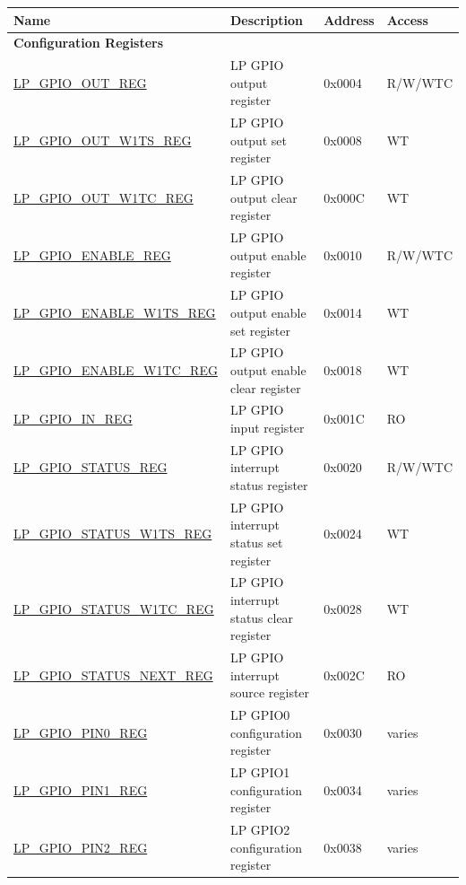 \begin{longtable}{ | p{5.7cm} | p{7cm} | p{1.3cm} | p{1.9cm} | }
\hline\rowcolor{lightgray}
\textbf{Name} & \textbf{Description} &  \textbf{Address} & \textbf{Access} \\ \hline
\endhead
\multicolumn{4}{|l|}{\textbf{Configuration Registers}} \\ \hline
\hyperref[regdesc:LPGPIOOUTREG]{LP\_GPIO\_OUT\_REG} & LP GPIO output register & 0x0004 & R/W/WTC \\ \hline
\hyperref[regdesc:LPGPIOOUTW1TSREG]{LP\_GPIO\_OUT\_W1TS\_REG} & LP GPIO output set register & 0x0008 & WT \\ \hline
\hyperref[regdesc:LPGPIOOUTW1TCREG]{LP\_GPIO\_OUT\_W1TC\_REG} & LP GPIO output clear register & 0x000C & WT \\ \hline
\hyperref[regdesc:LPGPIOENABLEREG]{LP\_GPIO\_ENABLE\_REG} & LP GPIO output enable register & 0x0010 & R/W/WTC \\ \hline
\hyperref[regdesc:LPGPIOENABLEW1TSREG]{LP\_GPIO\_ENABLE\_W1TS\_REG} & LP GPIO output enable set register & 0x0014 & WT \\ \hline
\hyperref[regdesc:LPGPIOENABLEW1TCREG]{LP\_GPIO\_ENABLE\_W1TC\_REG} & LP GPIO output enable clear register & 0x0018 & WT \\ \hline
\hyperref[regdesc:LPGPIOINREG]{LP\_GPIO\_IN\_REG} & LP GPIO input register & 0x001C & RO \\ \hline
\hyperref[regdesc:LPGPIOSTATUSREG]{LP\_GPIO\_STATUS\_REG} & LP GPIO interrupt status register & 0x0020 & R/W/WTC \\ \hline
\hyperref[regdesc:LPGPIOSTATUSW1TSREG]{LP\_GPIO\_STATUS\_W1TS\_REG} & LP GPIO interrupt status set register & 0x0024 & WT \\ \hline
\hyperref[regdesc:LPGPIOSTATUSW1TCREG]{LP\_GPIO\_STATUS\_W1TC\_REG} & LP GPIO interrupt status clear register & 0x0028 & WT \\ \hline
\hyperref[regdesc:LPGPIOSTATUSNEXTREG]{LP\_GPIO\_STATUS\_NEXT\_REG} & LP GPIO interrupt source register & 0x002C & RO \\ \hline
\hyperref[regdesc:LPGPIOPINNREG]{LP\_GPIO\_PIN0\_REG} & LP GPIO0 configuration register & 0x0030 & varies \\ \hline
\hyperref[regdesc:LPGPIOPINNREG]{LP\_GPIO\_PIN1\_REG} & LP GPIO1 configuration register & 0x0034 & varies \\ \hline
\hyperref[regdesc:LPGPIOPINNREG]{LP\_GPIO\_PIN2\_REG} & LP GPIO2 configuration register & 0x0038 & varies \\ \hline

\end{longtable}
